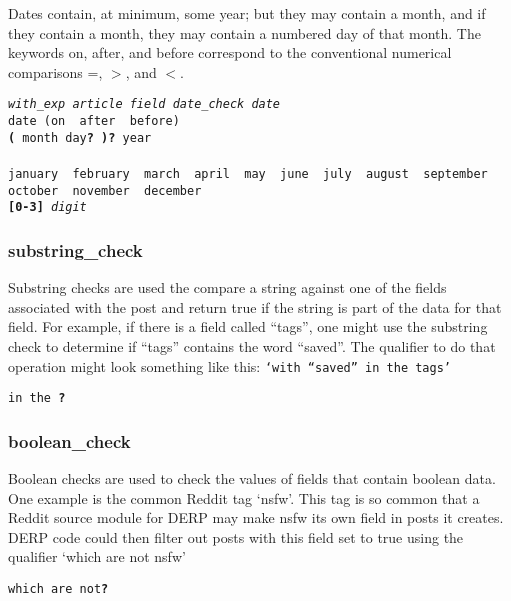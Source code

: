 Dates contain, at minimum, some year; but they may contain a month, and if they contain a month, they may contain a numbered day of
that month. The keywords on, after, and before correspond to the conventional numerical comparisons =, $>$, and $<$.
\begin{description}[labelindent=1cm,leftmargin=\onelen,labelwidth=1cm]
      \texttt{\textit{with\_exp article field date\_check date}}\\
      \texttt{date (on \textbf{\textbar} after \textbf{\textbar} before)}\\
      \texttt{\textbf{(} month day\textbf{?} \textbf{)?} year}\\
      \\
     \texttt{january \textbf{\textbar} february \textbf{\textbar} march \textbf{\textbar} april \textbf{\textbar} may \textbf{\textbar} june \textbf{\textbar} july \textbf{\textbar} august \textbf{\textbar} september \textbf{\textbar} october \textbf{\textbar} november \textbf{\textbar} december}\\
     \texttt{\textbf{[0-3]} \textit{digit}}\\
\end{description}

\subsubsection{substring\_check}
Substring checks are used the compare a string against one of the fields associated with the post and return true if the string is part
of the data for that field. For example, if there is a field called “tags”, one might use the substring check to determine if “tags”
contains the word “saved”. The qualifier to do that operation might look something like this: \texttt{‘with “saved” in the tags’}
\begin{description}[labelindent=1cm,leftmargin=\onelen,labelwidth=1cm]
     
     \texttt{in the \textbf{?}}
\end{description}

\subsubsection{boolean\_check}
Boolean checks are used to check the values of fields that contain boolean data. One example is the common Reddit tag ‘nsfw’. This tag
is so common that a Reddit source module for DERP may make nsfw its own field in posts it creates. DERP code could then filter out posts
with this field set to true using the qualifier ‘which are not nsfw’
\begin{description}[labelindent=1cm,leftmargin=\onelen,labelwidth=1cm]
          
          \texttt{which are not\textbf{?}}
\end{description}

